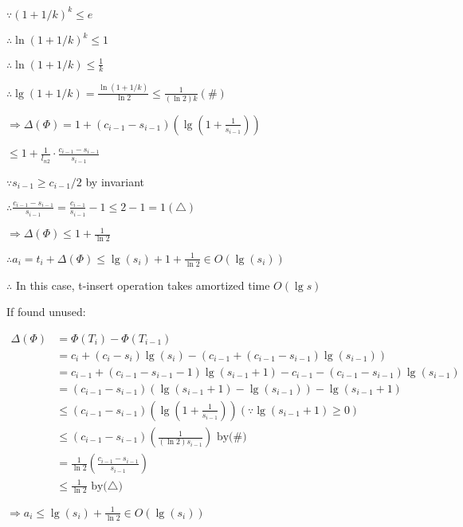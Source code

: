 \documentclass[12pt]{article}
\begin{document}
$ \because(1+1 / k)^k \leq e $

$ \therefore \ln (1+1 / k)^k \leq 1 $

$ \therefore \ln (1+1 / k) \leq \frac{1}{k} $

$ \therefore \lg (1+1 / k)=\frac{\ln (1+1 / k)}{\ln 2} \leq \frac{1}{(\ln2) k} (\#)$

$ \Rightarrow \Delta(\Phi)=1+\left(c_{i-1}-s_{i-1}\right)\left(\lg\left(1+\frac{1}{s_{i-1}}\right)\right) $

$ \leq 1+\frac{1}{l_{n 2}} \cdot \frac{c_{i-1}-s_{i-1}}{s_{i-1}} $

$ \because s_{i-1} \geqslant c_{i-1} / 2  $ by invariant

$ \therefore \frac{c_{i-1}-s_{i-1}}{s_{i-1}}=\frac{c_{i-1}}{s_{i-1}}-1 \leq 2-1=1 (\triangle)$

$ \Rightarrow \Delta(\Phi) \leq 1+\frac{1}{ \ln 2} $

$ \therefore a_i=t_i+\Delta(\Phi) \leq \lg \left(s_i\right)+1+\frac{1}{\ln 2} \in O (\lg (s_i)) $ 

$\therefore$ In this case, t-insert operation takes amortized time  $O (\lg s) $ 

If found unused:

$\begin{aligned}
   \Delta(\Phi)  &=\Phi\left(T_i\right)-\Phi\left(T_{i-1}\right) \\ 
& =c_i+\left(c_{i}-s_i\right) \lg \left(s_i\right)-\left(c_{i-1}+\left(c_{i-1}-s_{i-1}\right) \lg \left(s_{i-1}\right)\right) \\
& =c_{i-1}+\left(c_{i-1}-s_{i-1}-1\right) \lg \left(s_{i-1}+1\right)-c_{i-1}-\left(c_{i-1}-s_{i-1}\right) \lg \left(s_{i-1}\right) \\
& =\left(c_{i-1}-s_{i-1}\right)\left(\lg \left(s_{i-1}+1\right)-\lg \left(s_{i-1}\right)\right)-\lg \left(s_{i-1}+1\right) 
\\
& \leq\left(c_{i-1}-s_{i-1}\right)\left(\lg \left(1+\frac{1}{s_{i-1}}\right)\right) (\because \lg \left(s_{i-1}+1\right) \geq 0 )\\
& \leq\left(c_{i-1}-s_{i-1}\right)\left(\frac{1}{(\ln 2) s_{i-1}}\right) \text{ by(\#)}\\
& =\frac{1}{\ln 2}\left(\frac{c_{i-1}-s_{i-1}}{s_{i-1}}\right) \\ &\leq \frac{1}{\ln 2}  \text{ by(}\triangle\text{)}
\end{aligned} $



$\Rightarrow a_i \leqslant \lg \left(s_i\right)+\frac{1}{\ln 2} \in O\left(\lg \left(s_i\right)\right)$
\end{document}
